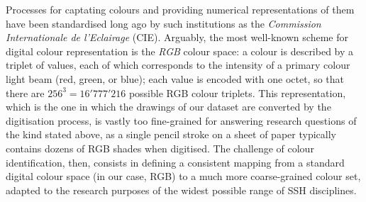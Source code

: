 \documentclass[11pt,a4paper]{article}
\begin{document}

Processes for captating colours and providing numerical representations of them have been standardised long ago by such institutions as the  \textit{Commission Internationale de l'Eclairage} (CIE). Arguably, the most well-known scheme for digital colour representation is the {\em RGB} colour space: a colour is described by a triplet of values, each of which corresponds to the intensity of a primary colour light beam (red, green, or blue); each value is encoded with one octet, so that there are $256^3 = 16'777'216$ possible RGB colour triplets. This representation, which is the one in which the drawings of our dataset are converted by the digitisation process, is vastly too fine-grained for answering research questions of the kind stated above, as a single pencil stroke on a sheet of paper typically contains dozens of RGB shades when digitised. The challenge of colour identification, then, consists in defining a consistent mapping from a standard digital colour space (in our case, RGB) to a much more coarse-grained colour set, adapted to the research purposes of the widest possible range of SSH disciplines.
\end{document}
